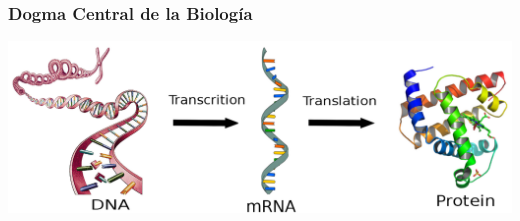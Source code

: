     \begin{frame}\frametitle{\textbf{Dogma Central de la Biología}}
        \begin{center}
          \includegraphics[scale=.26]{images/centralDogma.png}
        \end{center}       
    \end{frame}
